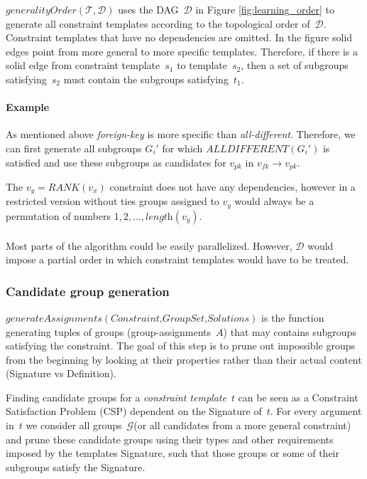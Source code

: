 \documentclass{ecai}
\newcommand{\constraints}{\ensuremath{\mathcal{T}}\xspace}
\newcommand{\format}[1]{\textit{#1}\xspace}
\newcommand{\generategroups}{\format{generateAssignments}}
\newcommand{\constrainttorder}{\format{generalityOrder}}
\newcommand{\template}{\format{constraint template}}
\newcommand{\CSignature}{Signature\xspace}
\newcommand{\CFunction}{Definition\xspace}
\newcommand{\dependencies}{\ensuremath{\mathcal{D}}\xspace}
\newcommand{\groups}{\ensuremath{\mathcal{G}}\xspace}
\newcommand{\eccalc}[2]{\ensuremath{#1 = #2}}
\newcommand{\ecrank}[2]{\eccalc{#1}{\mathit{RANK}(#2)}}
\newcommand{\ecfkey}[2]{\ensuremath{#1 \rightarrow #2}}
\newcommand{\ecalldiff}[1]{\ensuremath{\mathit{ALLDIFFERENT}(#1)}}
\begin{document}
$\constrainttorder(\constraints,\dependencies)$ uses the DAG~\dependencies in Figure \ref{fig:learning_order} to generate all constraint templates according to the topological order of~\dependencies.
Constraint templates that have no dependencies are omitted.
In the figure solid edges point from more general to more specific templates.
Therefore, if there is a solid edge from constraint template~$s_1$ to template~$s_2$, then a set of subgroups satisfying~$s_2$ must contain the subgroups satisfying~$t_1$.


\paragraph{Example}
As mentioned above \textit{foreign-key} is more specific than \textit{all-different}.
Therefore, we can first generate all subgroups $G_i'$ for which \ecalldiff{G_i'} is satisfied and use these subgroups as candidates for $v_{pk}$ in \ecfkey{v_{fk}}{v_{pk}}.

The \ecrank{v_y}{v_x} constraint does not have any dependencies, however in a restricted version without ties groups assigned to $v_y$ would always be a permutation of numbers $1, 2, ..., \textit{length}(v_y)$.
\\\\
Most parts of the algorithm could be easily parallelized.
However, \dependencies would impose a partial order in which constraint templates would have to be treated.

\subsubsection{Candidate group generation}
$\generategroups(\textit{Constraint,GroupSet,Solutions})$ is the function generating tuples of groups (group-assignments~$A$) that may contains subgroups satisfying the constraint.
The goal of this step is to prune out impossible groups from the beginning by looking at their properties rather than their actual content (\CSignature vs \CFunction).

Finding candidate groups for a \template~$t$ can be seen as a Constraint Satisfaction Problem (CSP) dependent on the \CSignature of~$t$.
For every argument in~$t$ we consider all groups~\groups (or all candidates from a more general constraint) and prune these candidate groups using their types and other requirements imposed by the templates \CSignature, such that those groups or some of their subgroups satisfy the \CSignature.
\end{document}
